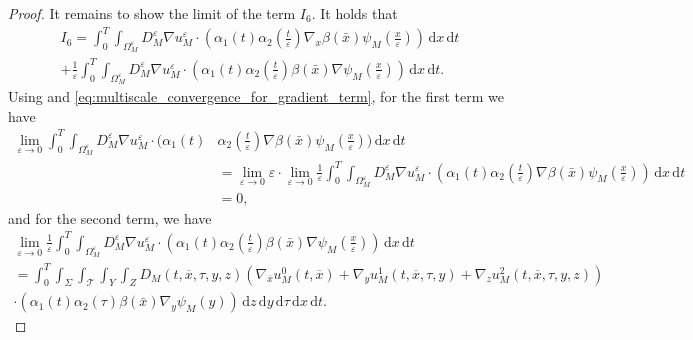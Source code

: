 \documentclass[11pt]{article}
\def\es{\varepsilon}
\def\omm{\Omega_M^\varepsilon}
\def\T{\mathcal{T}}
\newcommand{\di}[1]{\,\mathrm{d}#1}
\begin{document}
\begin{proof}
It remains to show the limit of the term $I_6$. It holds that
\begin{multline*}
    I_6=\int_0^T\int_{\omm}  D_M^\es  \nabla u_M^\es\cdot (\alpha_1(t)\alpha_2(\frac{t}{\es})\nabla_{ x}\beta(\bar x) \psi_M(\frac{x}{\es})) \di{x}\di{t}\\
    +\frac1\es\int_0^T\int_{\omm}  D_M^\es  \nabla u_M^\es\cdot (\alpha_1(t)\alpha_2(\frac{t}{\es})\beta(\bar x) \nabla\psi_M(\frac{x}{\es})) \di{x}\di{t}.
\end{multline*}
Using  and \eqref{eq:multiscale_convergence_for_gradient_term}, for the first term we have 
\begin{align*}
    \lim_{\es\rightarrow 0} \int_0^T\int_{\omm}  D_M^\es  \nabla u_M^\es\cdot (\alpha_1(t)&\alpha_2(\frac{t}{\es})\nabla\beta(\bar x)\psi_M(\frac{x}{\es})) \di{x}\di{t}\\
    &=\lim_{\es\rightarrow 0}\es\cdot \lim_{\es\rightarrow 0} \frac1\es \int_0^T\int_{\omm}  D_M^\es  \nabla u_M^\es\cdot (\alpha_1(t)\alpha_2(\frac{t}{\es})\nabla\beta(\bar x)\psi_M(\frac{x}{\es})) \di{x}\di{t}\\
    &= 0,
\end{align*}
and for the second term, we have 
\begin{multline*}
    \lim_{\es\rightarrow 0}\frac1\es\int_0^T\int_{\omm}  D_M^\es  \nabla u_M^\es\cdot (\alpha_1(t)\alpha_2(\frac{t}{\es})\beta(\bar x) \nabla\psi_M(\frac{x}{\es})) \di{x}\di{t}\\
    =\int_0^T\int_{\Sigma}\int_\T\int_{Y}\int_Z   D_M(t,\overline{x},\tau,y,z)
    \left( \nabla_{\overline{x}}u_M^0(t,\overline{x})+\nabla_y u_M^1(t,\overline{x},\tau,y)+\nabla_zu_M^2(t,\overline{x},\tau,y,z)\right)\\
    \cdot ( \alpha_1(t)\alpha_2(\tau)\beta(\bar x) \nabla_y\psi_M(y)) \di{z}\di{y}\di{\tau}\di{x}\di{t}.
\end{multline*}

 


\end{proof}
\end{document}
